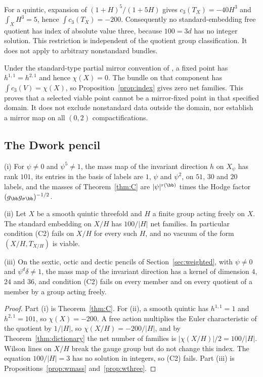 For a quintic, expansion of $(1+H)^5/(1+5H)$ gives
$c_3(T_X)=-40H^3$ and $\int_XH^3=5$, hence $\int c_3(T_X)=-200$.
Consequently no standard-embedding
free quotient has index of absolute value three, because $100=3d$ has no
integer solution. This restriction is independent of the quotient group
classification. It does not apply to arbitrary nonstandard bundles.

Under the standard-type partial mirror convention of \cite{Mirror}, a
fixed point has $h^{1,1}=h^{2,1}$ and hence $\chi(X)=0$. The bundle on
that component has $\int c_3(V)=\chi(X)$, so Proposition~\ref{prop:index}
gives zero net families. This proves that a selected viable point cannot
be a mirror-fixed point in that specified domain. It does not exclude
nonstandard data outside the domain, nor establish a mirror map on all
$(0,2)$ compactifications.



\subsection{The Dwork pencil}

\begin{proposition}\label{prop:dworkselect}
\textup{(i)} For $\psi\ne0$ and $\psi^5\ne1$, the mass map of the invariant
direction $h$ on $X_\psi$ has rank $101$, its entries in the basis of
labels are $1$, $\psi$ and $\psi^2$, on $51$, $30$ and $20$ labels, and the
masses of Theorem~\ref{thm:C} are $|\psi|^{r(\bb)}$ times the Hodge factor
$(g_{\bb}g_{\sigma\bb})^{-1/2}$.

\textup{(ii)} Let $X$ be a smooth quintic threefold and $H$ a finite group
acting freely on $X$. The standard embedding on $X/H$ has
$100/|H|$ net families. In particular condition \textup{(C2)} fails on
$X/H$ for every such $H$, and no vacuum of the form $(X/H,T_{X/H})$ is
viable.

\textup{(iii)} On the sextic, octic and dectic pencils of
Section~\ref{sec:weighted}, with $\psi\ne0$ and $\psi^d\delta\ne1$, the
mass map of the invariant direction has a kernel of dimension $4$, $24$ and
$36$, and condition \textup{(C2)} fails on every member and on every
quotient of a member by a group acting freely.
\end{proposition}

\begin{proof}
Part (i) is Theorem~\ref{thm:C}. For (ii), a smooth quintic has
$h^{1,1}=1$ and $h^{2,1}=101$, so $\chi(X)=-200$. A free action multiplies
the Euler characteristic of the quotient by $1/|H|$, so
$\chi(X/H)=-200/|H|$, and by Theorem~\ref{thm:dictionary} the net number of
families is $|\chi(X/H)|/2=100/|H|$. Wilson lines on $X/H$ break the gauge
group but do not change this index. The equation $100/|H|=3$ has no
solution in integers, so (C2) fails. Part (iii) is
Propositions~\ref{prop:wmass} and~\ref{prop:wthree}.
\end{proof}

